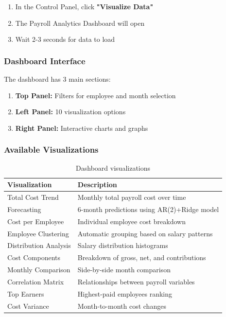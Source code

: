 \documentclass[11pt,a4paper]{article}
\begin{document}
\begin{enumerate}[leftmargin=*]
    \item In the Control Panel, click \textbf{"Visualize Data"}
    \item The Payroll Analytics Dashboard will open
    \item Wait 2-3 seconds for data to load
\end{enumerate}

\subsubsection{Dashboard Interface}

The dashboard has 3 main sections:

\begin{enumerate}[leftmargin=*]
    \item \textbf{Top Panel:} Filters for employee and month selection
    \item \textbf{Left Panel:} 10 visualization options
    \item \textbf{Right Panel:} Interactive charts and graphs
\end{enumerate}

\subsubsection{Available Visualizations}

\begin{table}[h]
\centering
\small
\begin{tabular}{@{} l p{8cm} @{}}
\toprule
\textbf{Visualization} & \textbf{Description} \\
\midrule
Total Cost Trend & Monthly total payroll cost over time \\
Forecasting & 6-month predictions using AR(2)+Ridge model \\
Cost per Employee & Individual employee cost breakdown \\
Employee Clustering & Automatic grouping based on salary patterns \\
Distribution Analysis & Salary distribution histograms \\
Cost Components & Breakdown of gross, net, and contributions \\
Monthly Comparison & Side-by-side month comparison \\
Correlation Matrix & Relationships between payroll variables \\
Top Earners & Highest-paid employees ranking \\
Cost Variance & Month-to-month cost changes \\
\bottomrule
\end{tabular}
\caption{Dashboard visualizations}
\end{table}
\end{document}
